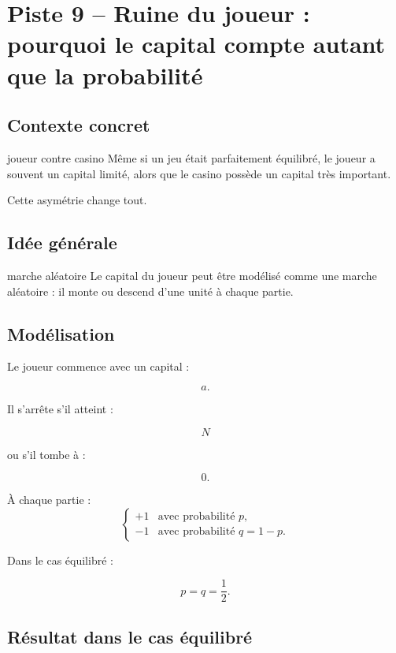 \documentclass[11pt,a4paper]{article}
\begin{document}
\section{Piste 9 -- Ruine du joueur : pourquoi le capital compte autant que la probabilité}

\subsection{Contexte concret}

\begin{contexte}{joueur contre casino}
Même si un jeu était parfaitement équilibré, le joueur a souvent un capital limité, alors que le casino possède un capital très important.

Cette asymétrie change tout.
\end{contexte}

\subsection{Idée générale}

\begin{idee}{marche aléatoire}
Le capital du joueur peut être modélisé comme une marche aléatoire : il monte ou descend d'une unité à chaque partie.
\end{idee}

\subsection{Modélisation}

Le joueur commence avec un capital :

\[
a.
\]

Il s'arrête s'il atteint :

\[
N
\]

ou s'il tombe à :

\[
0.
\]

À chaque partie :
\[
\begin{cases}
+1 & \text{avec probabilité }p,\\
-1 & \text{avec probabilité }q=1-p.
\end{cases}
\]

Dans le cas équilibré :

\[
p=q=\frac12.
\]

\subsection{Résultat dans le cas équilibré}
\end{document}

